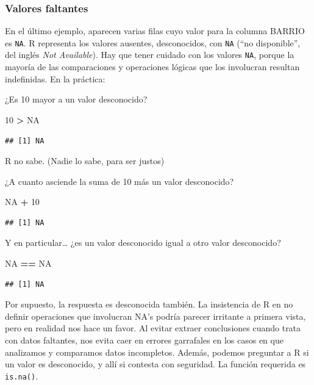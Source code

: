 \documentclass[]{book}
\newenvironment{Shaded}{\begin{snugshade}}{\end{snugshade}}
\newcommand{\DecValTok}[1]{\textcolor[rgb]{0.00,0.00,0.81}{#1}}
\newcommand{\StringTok}[1]{\textcolor[rgb]{0.31,0.60,0.02}{#1}}
\newcommand{\OtherTok}[1]{\textcolor[rgb]{0.56,0.35,0.01}{#1}}
\newcommand{\OperatorTok}[1]{\textcolor[rgb]{0.81,0.36,0.00}{\textbf{#1}}}
\begin{document}
\subsubsection{Valores faltantes}\label{valores-faltantes}

En el último ejemplo, aparecen varias filas cuyo valor para la columna
BARRIO es \texttt{NA}. R representa los valores ausentes, desconocidos,
con \texttt{NA} (``no disponible'', del inglés \emph{Not Available}).
Hay que tener cuidado con los valores \texttt{NA}, porque la mayoría de
las comparaciones y operaciones lógicas que los involucran resultan
indefinidas. En la práctica:

¿Es 10 mayor a un valor desconocido?

\begin{Shaded}
\begin{Highlighting}[]
\DecValTok{10} \OperatorTok{>}\StringTok{ }\OtherTok{NA}
\end{Highlighting}
\end{Shaded}

\begin{verbatim}
## [1] NA
\end{verbatim}

R no sabe. (Nadie lo sabe, para ser justos)

¿A cuanto asciende la suma de 10 más un valor desconocido?

\begin{Shaded}
\begin{Highlighting}[]
\OtherTok{NA} \OperatorTok{+}\StringTok{ }\DecValTok{10}
\end{Highlighting}
\end{Shaded}

\begin{verbatim}
## [1] NA
\end{verbatim}

Y en particular\ldots{} ¿es un valor desconocido igual a otro valor
desconocido?

\begin{Shaded}
\begin{Highlighting}[]
\OtherTok{NA} \OperatorTok{==}\StringTok{ }\OtherTok{NA}
\end{Highlighting}
\end{Shaded}

\begin{verbatim}
## [1] NA
\end{verbatim}

Por supuesto, la respuesta es desconocida también. La insistencia de R
en no definir operaciones que involucran NA's podría parecer irritante a
primera vista, pero en realidad nos hace un favor. Al evitar extraer
conclusiones cuando trata con datos faltantes, nos evita caer en errores
garrafales en los casos en que analizamos y comparamos datos
incompletos. Además, podemos preguntar a R si un valor es desconocido, y
allí si contesta con seguridad. La función requerida es
\texttt{is.na()}.
\end{document}
